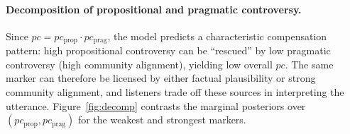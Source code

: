 \documentclass[12pt]{article}
\begin{document}
\paragraph{Decomposition of propositional and pragmatic controversy.}
Since $pc = pc_{\text{prop}} \cdot pc_{\text{prag}}$, the model predicts a characteristic compensation pattern: high propositional controversy can be ``rescued'' by low pragmatic controversy (high community alignment), yielding low overall $pc$. The same marker can therefore be licensed by either factual plausibility or strong community alignment, and listeners trade off these sources in interpreting the utterance. Figure~\ref{fig:decomp} contrasts the marginal posteriors over $(pc_{\text{prop}}, pc_{\text{prag}})$ for the weakest and strongest markers.
\end{document}
